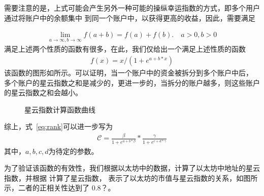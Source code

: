 需要注意的是，上式可能会产生另外一种可能的操纵幸运指数的方式，即多个用户通过将账户中的余额集中
到同一个账户中，以获得更高的收益，因此，需要满足

\begin{align}
\lim\limits_{a \to \infty, b\to \infty} f(a+b) = f(a) + f(b).\quad a>0, b>0
\end{align}
满足上述两个性质的函数有很多，在此，我们仅给出一个满足上述性质的函数
\begin{align}
f(x) = x/(1 + e^{a + b*x})
\end{align}
\noindent 该函数的图形如所示。可以证明，当一个账户中的资金被拆分到多个账户中后，
多个账户的星云指数之和是减少的，更进一步的，当拆分的账户越多，则这些账户的星云指数之和会越小。

\begin{figure}
\centering
{}
\caption{星云指数计算函数曲线}
\label{fig-nr}
\end{figure}

\vspace{1em}
综上，式~\ref{eq:rank}可以进一步写为
\begin{align}
\mathcal{C} =  \frac{\beta}{1+e^{a + b * \beta}} * \frac{\gamma}{1+e^{c + d * \gamma}}
\end{align}
\noindent 其中，$a, b, c, d$为待定的参数。

为了验证该函数的有效性，我们根据以太坊中的数据，计算了以太坊中地址的星云指数，并根据{\color{red} 计算了星云指数}，
表示了以太坊的市值与星云指数的关系，如图所示，二者的正相关性达到了{\color{red} 0.8？}。


